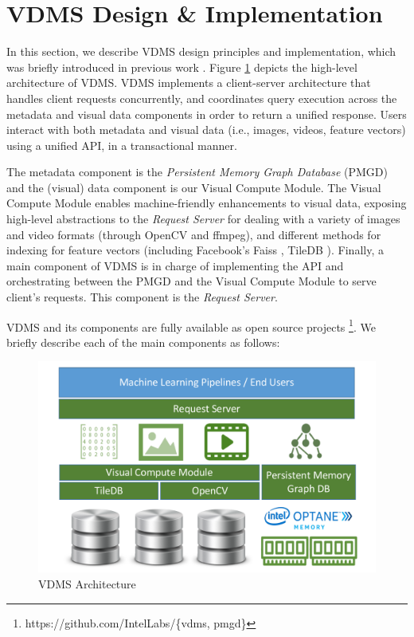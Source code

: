 \section{VDMS Design \& Implementation}
\label{arch}

In this section, we describe VDMS design principles and implementation,
which was briefly introduced in previous work \cite{vdms-nips}.
Figure \ref{fig:arch} depicts the high-level architecture of VDMS.
VDMS implements a client-server architecture that handles client
requests concurrently, and coordinates query execution across
the metadata and visual data components in order to return a unified response.
Users interact with both metadata and visual data
(i.e., images, videos, feature vectors) using a unified API,
in a transactional manner.

The metadata component is the \textit{Persistent Memory Graph
Database} (PMGD) and the (visual) data component is our Visual Compute Module.
The Visual Compute Module enables machine-friendly enhancements to
visual data, exposing high-level abstractions to the \textit{Request Server}
for dealing with a variety of images and video formats (through OpenCV and ffmpeg),
and different methods for indexing for feature vectors
(including Facebook's Faiss \cite{faiss}, TileDB \cite{TileDB}).
Finally, a main component of VDMS is in charge of implementing the API and orchestrating between the PMGD and the Visual Compute Module
to serve client's requests. This component is the \textit{Request Server}.

VDMS and its components are fully available as open source projects
\footnote{https://github.com/IntelLabs/\{vdms, pmgd\}}.
We briefly describe each of the main components as follows:

\begin{figure}
\centering
\includegraphics[width=1\columnwidth]{figures/vdms_arch.pdf}
\caption{VDMS Architecture}
\label{fig:arch}
\end{figure}

